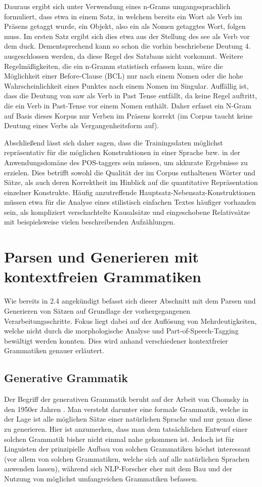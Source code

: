 \documentclass[12pt]{report}
\begin{document}
Dauraus ergibt sich unter Verwendung eines n-Grams umgangssprachlich formuliert, dass etwa in einem Satz, in welchem bereits ein Wort als Verb im Präsens getaggt wurde, ein Objekt, also ein als Nomen getaggtes Wort, folgen muss. Im ersten Satz ergibt sich dies etwa aus der Stellung des \glqq  see\grqq{} als Verb vor dem \glqq  duck\grqq{}. Dementsprechend kann so schon die vorhin beschriebene Deutung 4. ausgeschlossen werden, da diese Regel des Satzbaus nicht vorkommt. Weitere  Regelmäßigkeiten, die ein n-Gramm statistisch erfassen kann, wäre die Möglichkeit einer Before-Clause (BCL) nur nach einem Nomen oder die hohe Wahrscheinlichkeit eines Punktes nach einem Nomen im Singular. Auffällig ist, dass die Deutung von saw als Verb in Past Tense entfällt, da keine Regel auftritt, die ein Verb in Past-Tense vor einem Nomen enthält. Daher erfasst ein N-Gram auf Basis dieses Korpus nur Verben im Präsens korrekt (im Corpus taucht keine Deutung eines Verbs als Vergangenheitsform auf). 

Abschließend lässt sich daher sagen, dass die Trainingsdaten möglichst repräsentativ für die möglichen Konstruktionen in einer Sprache bzw. in der Anwendungsdomäne des POS-taggers sein müssen, um akkurate Ergebnisse zu erzielen. Dies betrifft sowohl die Qualität der im Corpus enthaltenen Wörter und Sätze, als auch deren Korrektheit im Hinblick auf die quantitative Repräsentation einzelner Konstrukte. Häufig anzutreffende Hauptsatz-Nebensatz-Konstruktionen müssen etwa für die Analyse eines stilistisch einfachen Textes häufiger vorhanden sein, als kompliziert verschachtelte Kausalsätze und eingeschobene Relativsätze mit beispielsweise vielen beschreibenden Aufzählungen.  

\section[Parsen und Generieren mit CFGs]{Parsen und Generieren mit kontextfreien Grammatiken}
Wie bereits in 2.4 angekündigt befasst sich dieser Abschnitt mit dem Parsen und Generieren von Sätzen auf Grundlage der vorhergegangenen Verarbeitungsschritte. Fokus liegt dabei auf der Auflösung von Mehrdeutigkeiten, welche nicht durch die morphologische Analyse und Part-of-Speech-Tagging bewältigt werden konnten. Dies wird anhand verschiedener kontextfreier Grammatiken genauer erläutert. 

\subsection{Generative Grammatik}
Der Begriff der generativen Grammatik beruht auf der Arbeit von Chomsky in den 1950er Jahren \cite{cho57}. Man versteht darunter eine formale Grammatik, welche in der Lage ist alle möglichen Sätze einer natürlichen Sprache und nur genau diese zu generieren. Hier ist anzumerken, dass man dem tatsächlichen Entwurf einer solchen Grammatik bisher nicht einmal nahe gekommen ist. Jedoch ist für Linguisten der prinzipielle Aufbau von solchen Grammatiken höchst interessant (vor allem von solchen Grammatiken, welche sich auf alle natürlichen Sprachen anwenden lassen), während sich NLP-Forscher eher mit dem Bau und der Nutzung von möglichst umfangreichen Grammatiken befassen. 
\end{document}

